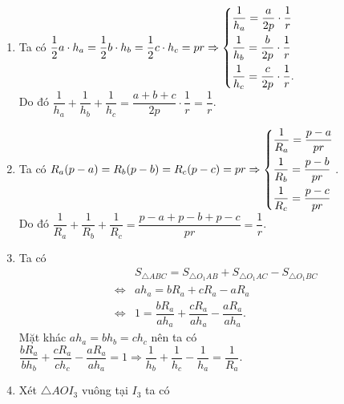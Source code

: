 \begin{bt}
{\begin{enumerate}
\begin{enumerate}[1)]
{
				}
				\item 
				Ta có
				$\dfrac{1}{2} a\cdot h_a=\dfrac{1}{2}b\cdot h_b=\dfrac{1}{2}c\cdot h_c=pr\Rightarrow \left\{\begin{aligned}&\dfrac{1}{h_a}=\dfrac{a}{2p}\cdot \dfrac{1}{r}\\ & \dfrac{1}{h_b}=\dfrac{b}{2p}\cdot \dfrac{1}{r}\\ &\dfrac{1}{h_c}=\dfrac{c}{2p}\cdot \dfrac{1}{r}.\end{aligned}\right.$\\
				Do đó $\dfrac{1}{h_a}+\dfrac{1}{h_b}+\dfrac{1}{h_c}=\dfrac{a+b+c}{2p}\cdot \dfrac{1}{r}=\dfrac{1}{r}$.
				\item
				Ta có
				$R_a (p-a)=R_b(p-b)=R_c(p-c)=pr\Rightarrow \left\{\begin{aligned}&\dfrac{1}{R_a}=\dfrac{p-a}{pr}\\&\dfrac{1}{R_b}=\dfrac{p-b}{pr}\\&\dfrac{1}{R_c}=\dfrac{p-c}{pr}\end{aligned}\right.$.\\
				Do đó $\dfrac{1}{R_a}+\dfrac{1}{R_b}+\dfrac{1}{R_c}=\dfrac{p-a+p-b+p-c}{pr}=\dfrac{1}{r}$.
				\item 
				Ta có 
				\allowdisplaybreaks
				\begin{eqnarray*}
					&&S_{\triangle ABC} = S_{\triangle O_1AB}+S_{\triangle O_1AC}-S_{\triangle O_1BC}\\ 
					&\Leftrightarrow& ah_a = bR_a + cR_a-aR_a\\
					&\Leftrightarrow& 1 =  \dfrac{bR_a}{ah_a}+\dfrac{cR_a}{ah_a}-\dfrac{aR_a}{ah_a}.
				\end{eqnarray*}
				Mặt khác $ah_a=bh_b=ch_c$ nên 
				ta có $\dfrac{bR_a}{bh_b}+\dfrac{cR_a}{ch_c}-\dfrac{aR_a}{ah_a}=1 \Rightarrow \dfrac{1}{h_b}+\dfrac{1}{h_c}-\dfrac{1}{h_a}=\dfrac{1}{R_a}$.
				\item Xét $\triangle AOI_3$ vuông tại $I_3$ ta có
\end{enumerate}
\end{enumerate}}
\end{bt}
